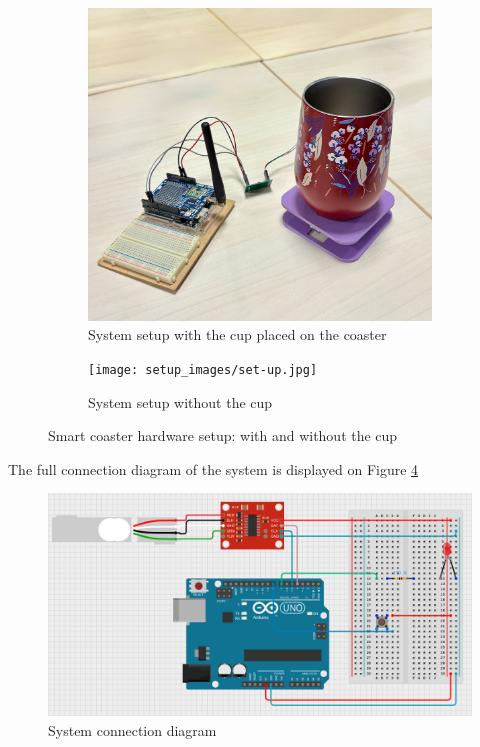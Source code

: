 \begin{figure}[H]
    \centering
    \begin{subfigure}[b]{0.45\linewidth}
        \centering
        \includegraphics[width=\linewidth]{setup_images/set-up-with-cup.jpg}
        \caption{System setup with the cup placed on the coaster}
        \label{fig:setup-with-cup}
    \end{subfigure}
    \hfill
    \begin{subfigure}[b]{0.45\linewidth}
        \centering
        \texttt{[image: setup\_images/set-up.jpg]}
        \caption{System setup without the cup}
        \label{fig:setup-without-cup}
    \end{subfigure}
    \caption{Smart coaster hardware setup: with and without the cup}
    \label{fig:system-setup-views}
\end{figure}

The full connection diagram of the system is displayed on Figure \ref{fig:circuit}
\begin{figure}[H]
    \centering
    \includegraphics[width=\linewidth]{load cell images/circuit.png}
    \caption{System connection diagram}
    \label{fig:circuit}
\end{figure}

